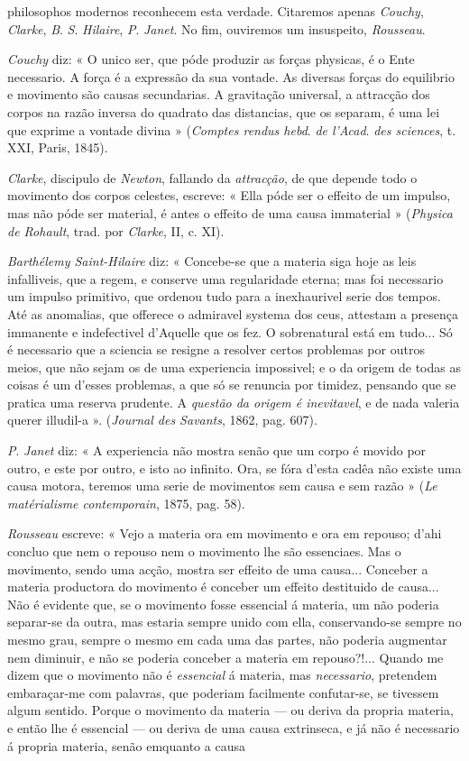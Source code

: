 philosophos modernos reconhecem esta verdade. Citaremos apenas \emph{Couchy}, \emph{Clarke}, \emph{B}. \emph{S}. \emph{Hilaire}, \emph{P}. \emph{Janet}. No fim, ouviremos um insuspeito, \emph{Rousseau}.\par \emph{Couchy} diz: « O unico ser, que póde produzir as forças physicas, é o Ente necessario. A força é a expressão da sua vontade. As diversas forças do equilibrio e movimento são causas secundarias. A gravitação universal, a attracção dos corpos na razão inversa do quadrato das distancias, que os separam, é uma lei que exprime a vontade divina » (\emph{Comptes rendus hebd}. \emph{de l'Acad}. \emph{des sciences}, t. XXI, Paris, 1845).\par \emph{Clarke}, discipulo de \emph{Newton}, fallando da \emph{attracção}, de que depende todo o movimento dos corpos celestes, escreve: « Ella póde ser o effeito de um impulso, mas não póde ser material, é antes o effeito de uma causa immaterial » (\emph{Physica de Rohault}, trad. por \emph{Clarke}, II, c. XI).\par \emph{Barthélemy Saint-Hilaire} diz: « Concebe-se que a materia siga hoje as leis infalliveis, que a regem, e conserve uma regularidade eterna; mas foi necessario um impulso primitivo, que ordenou tudo para a inexhaurivel serie dos tempos. Até as anomalias, que offerece o admiravel systema dos ceus, attestam a presença immanente e indefectivel d'Aquelle que os fez. O sobrenatural está em tudo... Só é necessario que a sciencia se resigne a resolver certos problemas por outros meios, que não sejam os de uma experiencia impossivel; e o da origem de todas as coisas é um d'esses problemas, a que só se renuncia por timidez, pensando que se pratica uma reserva prudente. A \emph{questão da origem é inevitavel}, e de nada valeria querer illudil-a ». (\emph{Journal des Savants}, 1862, pag. 607).\par \emph{P}. \emph{Janet} diz: « A experiencia não mostra senão que um corpo é movido por outro, e este por outro, e isto ao infinito. Ora, se fóra d'esta cadêa não existe uma causa motora, teremos uma serie de movimentos sem causa e sem razão » (\emph{Le matérialisme contemporain}, 1875, pag. 58).\par \emph{Rousseau} escreve: « Vejo a materia ora em movimento e ora em repouso; d'ahi concluo que nem o repouso nem o movimento lhe são essenciaes. Mas o movimento, sendo uma acção, mostra ser effeito de uma causa... Conceber a materia productora do movimento é conceber um effeito destituido de causa... Não é evidente que, se o movimento fosse essencial á materia, um não poderia separar-se da outra, mas estaria sempre unido com ella, conservando-se sempre no mesmo grau, sempre o mesmo em cada uma das partes, não poderia augmentar nem diminuir, e não se poderia conceber a materia em repouso?!... Quando me dizem que o movimento não é \emph{essencial} á materia, mas \emph{necessario}, pretendem embaraçar-me com palavras, que poderiam facilmente confutar-se, se tivessem algum sentido. Porque o movimento da materia --- ou deriva da propria materia, e então lhe é essencial --- ou deriva de uma causa extrinseca, e já não é necessario á propria materia, senão emquanto a causa 